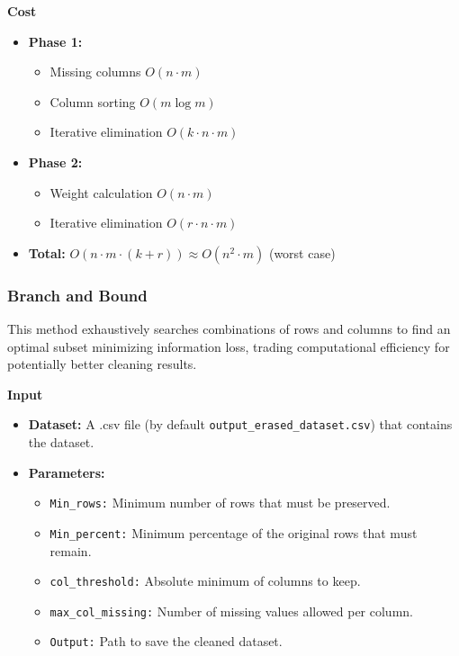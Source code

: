 \documentclass[a4paper,12pt]{article}
\begin{document}
\textbf{Cost}
\begin{itemize}
    \item \textbf{Phase 1:} 
    \begin{itemize}
        \item Missing columns $O(n \cdot m)$ 
        \item Column sorting $O(m \log m)$
        \item Iterative elimination $O(k \cdot n \cdot m)$
    \end{itemize}
    \item \textbf{Phase 2:}
    \begin{itemize}
        \item Weight calculation $O(n \cdot m)$ 
        \item Iterative elimination $O(r \cdot n \cdot m)$
    \end{itemize}
    \item \textbf{Total:}  $O(n \cdot m \cdot (k + r)) \approx O(n^2 \cdot m)$ (worst case)
\end{itemize}



\subsubsection{Branch and Bound}
This method exhaustively searches combinations of rows and columns to find an optimal subset minimizing information loss, trading computational efficiency for potentially better cleaning results.

\textbf{Input}
\begin{itemize}
    \item \textbf{Dataset:} A .csv file (by default \texttt{output\_erased\_dataset.csv}) that contains the dataset.
    \item \textbf{Parameters:}
    \begin{itemize}
        \item \texttt{Min\_rows:} Minimum number of rows that must be preserved.
        \item \texttt{Min\_percent:} Minimum percentage of the original rows that must remain.
        \item \texttt{col\_threshold:} Absolute minimum of columns to keep.
        \item \texttt{max\_col\_missing:} Number of missing values allowed per column.
        \item \texttt{Output:} Path to save the cleaned dataset.
    \end{itemize}
\end{itemize}
\end{document}
